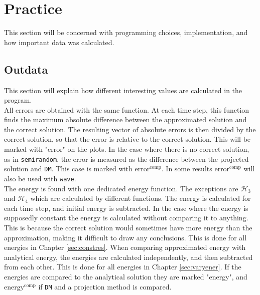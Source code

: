 \chapter{Practice}%
This section will be concerned with programming choices, implementation, and how important data was calculated.

\section{Outdata} %
This section will explain how different interesting values are calculated in the program. \\

\noindent All errors are obtained with the same function. At each time step, this function finds the maximum absolute difference between the approximated solution and the correct solution. The resulting vector of absolute errors is then divided by the correct solution, so that the error is relative to the correct solution. This will be marked with "error" on the plots. In the case where there is no correct solution, as in \texttt{semirandom}, the error is measured as the difference between the projected solution and \texttt{DM}. This case is marked with $\text{error}^{\text{comp}}$. In some results $\text{error}^{\text{comp}}$ will also be used with \texttt{wave}.  \\

\noindent The energy is found with one dedicated energy function. The exceptions are $\mathcal{H}_3$ and $\mathcal{H}_4$ which are calculated by different functions. The energy is calculated for each time step, and initial energy is subtracted. In the case where the energy is supposedly constant the energy is calculated without comparing it to anything. This is because the correct solution would sometimes have more energy than the approximation, making it difficult to draw any conclusions. This is done for all energies in Chapter \ref{sec:constres}. When comparing approximated energy with analytical energy, the energies are calculated independently, and then subtracted from each other. This is done for all energies in Chapter \ref{sec:varyener}. If the energies are compared to the analytical solution they are marked "energy", and $\text{energy}^{\text{comp}}$ if \texttt{DM} and a projection method is compared. \\

